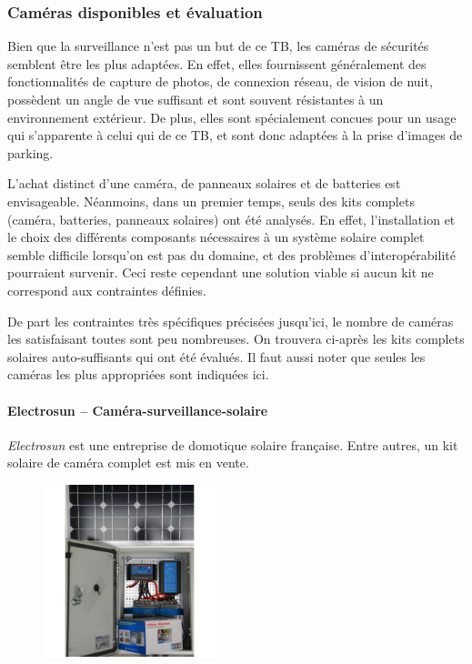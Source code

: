 \subsubsection{Caméras disponibles et évaluation}
Bien que la surveillance n'est pas un but de ce TB, les caméras de sécurités semblent être les plus adaptées. En effet, elles fournissent généralement des fonctionnalités de capture de photos, de connexion réseau, de vision de nuit, possèdent un angle de vue suffisant et sont souvent résistantes à un environnement extérieur. De plus, elles sont spécialement concues pour un usage qui s'apparente à celui qui de ce TB, et sont donc adaptées à la prise d'images de parking.

L'achat distinct d'une caméra, de panneaux solaires et de batteries est envisageable. Néanmoins, dans un premier temps, seuls des kits complets (caméra, batteries, panneaux solaires) ont été analysés. En effet, l'installation et le choix des différents composants nécessaires à un système solaire complet semble difficile lorsqu'on est pas du domaine, et des problèmes d'interopérabilité pourraient survenir. Ceci reste cependant une solution viable si aucun kit ne correspond aux contraintes définies.

De part les contraintes très spécifiques précisées jusqu'ici, le nombre de caméras les satisfaisant toutes sont peu nombreuses. On trouvera ci-après les kits complets solaires auto-suffisants qui ont été évalués. Il faut aussi noter que seules les caméras les plus appropriées sont indiquées ici.

\paragraph{\textbf{Electrosun} -- Caméra-surveillance-solaire}
\textit{Electrosun} est une entreprise de domotique solaire française. Entre autres, un kit solaire de caméra complet est mis en vente. \autocite{cam:electrosun_site}

\begin{figure}[h]
    \includegraphics[width=50mm]{img/conception/electrosun_cam.jpg}
    \centering
\end{figure}

